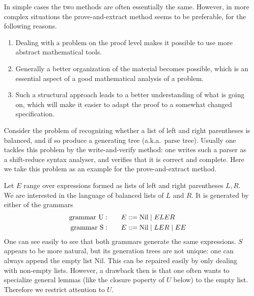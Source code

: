 \documentclass[12pt]{amsart}
\newcommand{\nil}{\mathrm{Nil}}
\newcommand{\BNFdef}{\mathtt{\; ::= \;}}
\newcommand{\BNFor}{\mid}
\newenvironment{enumeratei}{\begin{enumerate}[\upshape (i)]}
                           {\end{enumerate}}
\begin{document}
In simple cases the two methods are often essentially the same.
However, in more complex situations the prove-and-extract method seems
to be preferable, for the following reasons.
\begin{enumeratei}
\item Dealing with a problem on the proof level makes it possible to
  use more abstract mathematical tools.
\item Generally a better organization of the material becomes
  possible, which is an essential aspect of a good mathematical analysis
  of a problem.
\item Such a structural approach leads to a better understanding of
  what is going on, which will make it easier to adapt the proof to a
  somewhat changed specification.
\end{enumeratei}
Consider the problem of recognizing whether a list of left and right
parentheses is balanced, and if so produce a generating tree
(a.k.a.\ parse tree).  Usually one tackles this problem by the
write-and-verify method: one writes such a parser as a shift-reduce
syntax analyser, and verifies that it is correct and complete.  Here
we take this problem as an example for the prove-and-extract method.

Let $E$ range over expressions formed as lists of left and right
parentheses $L,R$.  We are interested in the \cite{Dyck82}
language of balanced lists of $L$ and $R$.  It is generated by either
of the grammars
\begin{align*}
  \hbox{grammar U}: &\qquad E \BNFdef \nil \BNFor ELER
  \\
  \hbox{grammar S}: &\qquad E \BNFdef \nil \BNFor LER \BNFor EE
\end{align*}
One can see easily to see that both grammars generate the same
expressions.  $S$ appears to be more natural, but its generation trees
are not unique: one can always append the empty list $\nil$.  This can
be repaired easily by only dealing with non-empty lists.  However,
a drawback then is that one often wants to specialize general
lemmas (like the closure poperty of $U$ below) to the empty list.
Therefore we restrict attention to $U$.
\end{document}

